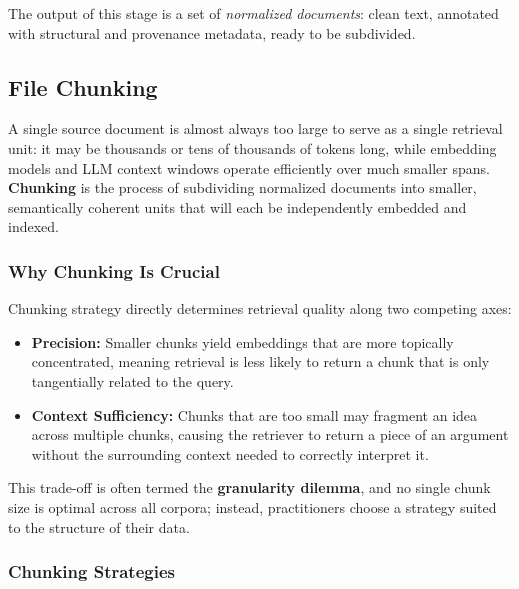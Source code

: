 \documentclass[11pt,a4paper]{article}
\begin{document}
The output of this stage is a set of \emph{normalized documents}: clean text, annotated with structural and provenance metadata, ready to be subdivided.

\subsection{File Chunking}

A single source document is almost always too large to serve as a single retrieval unit: it may be thousands or tens of thousands of tokens long, while embedding models and LLM context windows operate efficiently over much smaller spans. \textbf{Chunking} is the process of subdividing normalized documents into smaller, semantically coherent units that will each be independently embedded and indexed.

\subsubsection{Why Chunking Is Crucial}

Chunking strategy directly determines retrieval quality along two competing axes:

\begin{itemize}
  \item \textbf{Precision:} Smaller chunks yield embeddings that are more topically concentrated, meaning retrieval is less likely to return a chunk that is only tangentially related to the query.
  \item \textbf{Context Sufficiency:} Chunks that are too small may fragment an idea across multiple chunks, causing the retriever to return a piece of an argument without the surrounding context needed to correctly interpret it.
\end{itemize}

This trade-off is often termed the \textbf{granularity dilemma}, and no single chunk size is optimal across all corpora; instead, practitioners choose a strategy suited to the structure of their data.

\subsubsection{Chunking Strategies}
\end{document}
